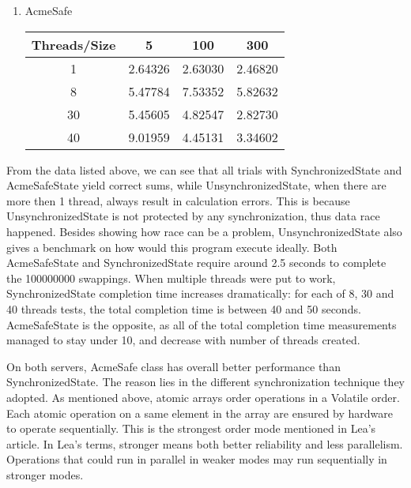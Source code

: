 \documentclass[letterpaper,twocolumn,10pt]{article}
\begin{document}
\begin{enumerate}
\begin{enumerate}
    \item 
    AcmeSafe 
    \begin{center}
      \begin{tabular}{|c|c|c|c|}
      \hline
        Threads/Size & 5 & 100 & 300 \\
      \hline 1 & 2.64326 & 2.63030 & 2.46820 \\
      \hline 8 & 5.47784 & 7.53352 & 5.82632 \\
      \hline 30 & 5.45605 & 4.82547 & 2.82730 \\
      \hline 40 & 9.01959 & 4.45131 & 3.34602 \\
      \hline
      \end{tabular}
    \end{center}
  \end{enumerate}
\end{enumerate}



From the data listed above, we can see that all trials with SynchronizedState and AcmeSafeState yield correct sums, 
while UnsynchronizedState, when there are more then 1 thread, always result in calculation errors.
This is because UnsynchronizedState is not protected by any synchronization, thus data race happened.
Besides showing how race can be a problem, UnsynchronizedState also gives a benchmark on how would this program execute ideally.
Both AcmeSafeState and SynchronizedState require around 2.5 seconds to complete the 100000000 swappings.
When multiple threads were put to work, SynchronizedState completion time increases dramatically:
for each of 8, 30 and 40 threads tests, the total completion time is between 40 and 50 seconds.
AcmeSafeState is the opposite, as all of the total completion time measurements managed to stay under 10, and decrease with number of threads created.


On both servers, AcmeSafe class has overall better performance than SynchronizedState.
The reason lies in the different synchronization technique they adopted.
As mentioned above, atomic arrays order operations in a Volatile order.
Each atomic operation on a same element in the array are ensured by hardware to operate sequentially.
This is the strongest order mode mentioned in Lea's article.
In Lea's terms, stronger means both better reliability and less parallelism.
Operations that could run in parallel in weaker modes may run sequentially in stronger modes.
\end{document}
